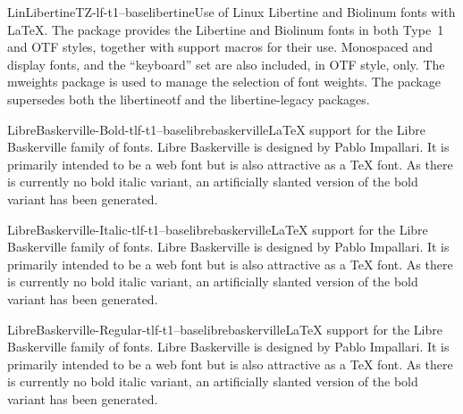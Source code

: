 \documentclass{ddltxtyp}
\begin{document}
\begin{package}{LinLibertineTZ-lf-t1--base}{libertine}{Use of Linux Libertine and Biolinum fonts with {\LaTeX}.}
The package provides the Libertine and Biolinum fonts in both
Type~1 and OTF styles, together with support macros for their
use. Monospaced and display fonts, and the ``keyboard'' set are
also included, in OTF style, only. The mweights package is used
to manage the selection of font weights. The package supersedes
both the libertineotf and the libertine-legacy packages.
\end{package}

\begin{package}{LibreBaskerville-Bold-tlf-t1--base}{librebaskerville}{{\LaTeX} support for the Libre Baskerville family of fonts.}
Libre Baskerville is designed by Pablo Impallari. It is
primarily intended to be a web font but is also attractive as a
TeX font. As there is currently no bold italic variant, an
artificially slanted version of the bold variant has been
generated.
\end{package}
\begin{package}{LibreBaskerville-Italic-tlf-t1--base}{librebaskerville}{{\LaTeX} support for the Libre Baskerville family of fonts.}
Libre Baskerville is designed by Pablo Impallari. It is
primarily intended to be a web font but is also attractive as a
TeX font. As there is currently no bold italic variant, an
artificially slanted version of the bold variant has been
generated.
\end{package}
\begin{package}{LibreBaskerville-Regular-tlf-t1--base}{librebaskerville}{{\LaTeX} support for the Libre Baskerville family of fonts.}
Libre Baskerville is designed by Pablo Impallari. It is
primarily intended to be a web font but is also attractive as a
TeX font. As there is currently no bold italic variant, an
artificially slanted version of the bold variant has been
generated.
\end{package}
\end{document}
